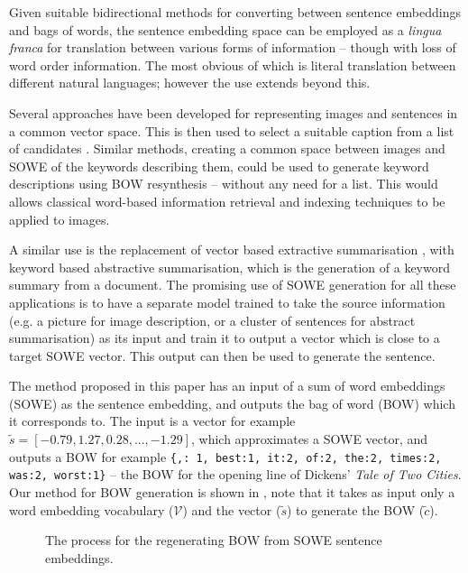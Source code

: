 \documentclass{llncs}
\renewcommand{\c}{\tilde{c}}
\newcommand{\s}{\tilde{s}}
\newcommand{\V}{\mathcal{V}}
\begin{document}
Given suitable bidirectional methods for converting between sentence embeddings and bags of words, the sentence embedding space can be employed as a \emph{lingua franca} for translation between various forms of information -- though with loss of word order information. The most obvious of which is literal translation between different natural languages; however the use extends beyond this.

Several approaches have been developed for representing images and sentences in a common vector space. This is then used to select a suitable caption from a list of candidates \parencite{farhadi2010every,socherDTRNN}. Similar methods, creating a common space between images and SOWE of the keywords describing them, could be used to generate keyword descriptions using BOW resynthesis -- without any need for a list. This would allows classical word-based information retrieval and indexing techniques to be applied to images.

A similar use is the replacement of vector based extractive summarisation \parencite{KaagebExtractiveSummaristation,yogatamaextractive}, with keyword based abstractive summarisation, which is the generation of a keyword summary from a document. The promising use of SOWE generation for all these applications is to have a separate model trained to take the source information (e.g. a picture for image description, or a cluster of sentences for abstract summarisation) as its input and train it to output a vector which is close to a target SOWE vector. This output can then be used to generate the sentence.


The method proposed in this paper has an input of a sum of word embeddings (SOWE) as the sentence embedding, and outputs the bag of word (BOW) which it corresponds to. The input is a vector for example $\s=[-0.79, 1.27,0.28,...,-1.29]$, which approximates a SOWE vector, and outputs a BOW for example \texttt{\{\mbox{,: 1}, \mbox{best:1}, \mbox{it:2}, \mbox{of:2}, \mbox{the:2}, \mbox{times:2}, \mbox{was:2}, \mbox{worst:1}\}} -- the BOW for the opening line of Dickens' \emph{Tale of Two Cities}. Our method for BOW generation is shown in , note that it takes as input only a word embedding vocabulary ($\V$) and the vector ($\s$) to generate the BOW ($\c$). 

\begin{figure}
	\centering 
	
	\caption{The process for the regenerating BOW from SOWE sentence embeddings.}
	\label{block_diagram}
\end{figure}
\end{document}
